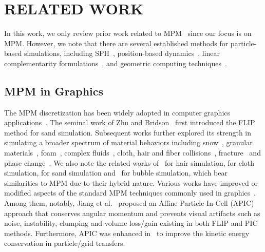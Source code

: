 \section{RELATED WORK}
\label{sec:related-work}

In this work, we only review prior work related to MPM~\cite{jiang2016material} since our focus is on MPM. However, we note that there are several established methods for particle-based simulations, including SPH~\cite{Desbrun:1996:SPH}, position-based dynamics~\cite{Muller:2004:Point-based,muller:2007:pbd,macklin:2014:PBDs}, linear complementarity formulations~\cite{Erleben:2013:LCP}, and geometric computing techniques~\cite{deGoes:2015:PPIFS,Sin:2009:Voronoi}.

\subsection{MPM in Graphics}
The MPM discretization has been widely adopted in computer graphics applications~\cite{jiang2016material}. 
The seminal work of Zhu and Bridson~\cite{Zhu:2005:Animating} first introduced the FLIP method for sand simulation. Subsequent works further explored its strength in simulating a broader spectrum of material behaviors including snow~\cite{Stomakhin:2013:MPMsnow}, granular materials~\cite{Daviet:2016:Semi-implicit,Klar:2016:Drucker,Tampubolon:2017:Multi,gao2018animating}, foam~\cite{Ram:2015:Material,yue:2015:mpm-plasticity}, complex fluids~\cite{Fang:2019:Silly,Gao:2017:AGIMPM}, cloth, hair and fiber collisions~\cite{Jiang:2017:Anisotropic,Fei:2017:MSLHI,fei:2018:cloth}, fracture~\cite{Wolper:2019:CD-MPM,Wolper:2020:anisompm} and phase change~\cite{Stomakhin:2014:Augmented,gao2018gpu,Su:2021:USOSVL}. We also note the related works of~\cite{mcadams:2009:incomp} for hair simulation, \cite{sifakis:2008:incomp} for cloth simulation, \cite{narain:2010:sand} for sand simulation and~\cite{patkar:2013:bubble} for bubble simulation, which bear similarities to MPM due to their hybrid nature.
Various works have improved or modified aspects of the standard MPM techniques commonly used in graphics~\cite{Fang:2020:IQ-MPM,Yue:2018:HG,XUE:2020:NF, Ding:2019:Thermomechanical}.
Among them, notably, Jiang et al.~ proposed an Affine Particle-In-Cell (APIC) approach that conserves angular momentum and prevents visual artifacts such as noise, instability, clumping and volume loss/gain existing in both FLIP and PIC methods. Furthermore, APIC was enhanced in~\cite{Fu:2017:PolyPIC,Hu:2018:Moving} to improve the kinetic energy conservation in particle/grid transfers. 
